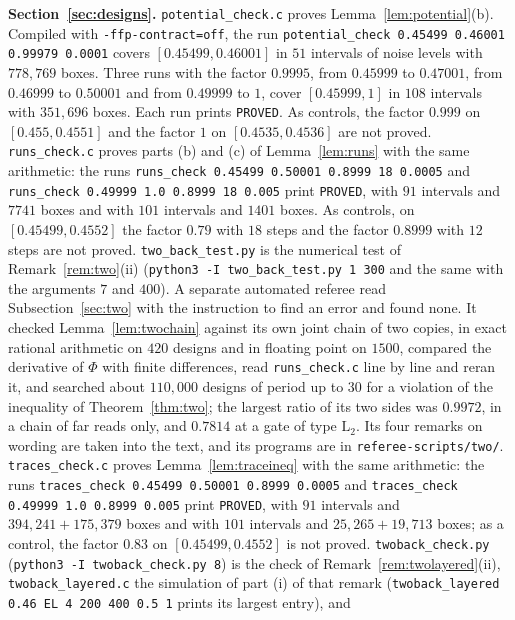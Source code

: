 \documentclass[11pt]{amsart}
\theoremstyle{definition}
\theoremstyle{remark}
\begin{document}
\medskip\noindent\textbf{Section~\ref{sec:designs}.} \texttt{potential\_check.c} proves
Lemma~\ref{lem:potential}(b). Compiled with \texttt{-ffp-contract=off}, the run
\texttt{potential\_check 0.45499 0.46001 0.99979 0.0001} covers $[0.45499,0.46001]$ in $51$
intervals of noise levels with $778{,}769$ boxes. Three runs with the factor $0.9995$, from
$0.45999$ to $0.47001$, from $0.46999$ to $0.50001$ and from $0.49999$ to $1$, cover
$[0.45999,1]$ in $108$ intervals with $351{,}696$ boxes. Each run prints \texttt{PROVED}. As controls, the factor $0.999$ on
$[0.455,0.4551]$ and the factor $1$ on $[0.4535,0.4536]$ are not proved. \texttt{runs\_check.c}
proves parts (b) and (c) of Lemma~\ref{lem:runs} with the same arithmetic: the runs
\texttt{runs\_check 0.45499 0.50001 0.8999 18 0.0005} and
\texttt{runs\_check 0.49999 1.0 0.8999 18 0.005} print \texttt{PROVED}, with $91$ intervals and
$7741$ boxes and with $101$ intervals and $1401$ boxes. As controls, on $[0.45499,0.4552]$ the
factor $0.79$ with $18$ steps and the factor $0.8999$ with $12$ steps are not proved.
\texttt{two\_back\_test.py} is the numerical test of Remark~\ref{rem:two}(ii)
(\texttt{python3 -I two\_back\_test.py 1 300} and the same with the arguments $7$ and $400$).
A separate automated referee read Subsection~\ref{sec:two} with the instruction to find an
error and found none. It checked Lemma~\ref{lem:twochain} against its own joint chain of two
copies, in exact rational arithmetic on $420$ designs and in floating point on $1500$, compared
the derivative of $\Phi$ with finite differences, read \texttt{runs\_check.c} line by line and
reran it, and searched about $110{,}000$ designs of period up to $30$ for a violation of the
inequality of Theorem~\ref{thm:two}; the largest ratio of its two sides was $0.9972$, in a chain
of far reads only, and $0.7814$ at a gate of type $\mathrm L_2$. Its four remarks on wording
are taken into the text, and its programs are in \texttt{referee-scripts/two/}.
\texttt{traces\_check.c} proves Lemma~\ref{lem:traceineq} with the same arithmetic: the runs
\texttt{traces\_check 0.45499 0.50001 0.8999 0.0005} and
\texttt{traces\_check 0.49999 1.0 0.8999 0.005} print \texttt{PROVED}, with $91$ intervals and
$394{,}241+175{,}379$ boxes and with $101$ intervals and $25{,}265+19{,}713$ boxes; as a
control, the factor $0.83$ on $[0.45499,0.4552]$ is not proved. \texttt{twoback\_check.py}
(\texttt{python3 -I twoback\_check.py 8}) is the check of Remark~\ref{rem:twolayered}(ii),
\texttt{twoback\_layered.c} the simulation of part (i) of that remark
(\texttt{twoback\_layered 0.46 EL 4 200 400 0.5 1} prints its largest entry), and
\end{document}
